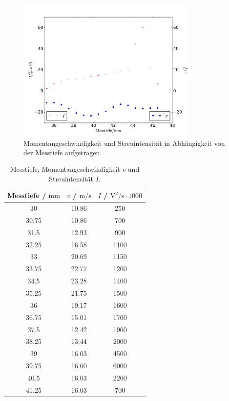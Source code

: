 \documentclass[
  bibliography=totoc,     %
  captions=tableheading,  %
  titlepage=firstiscover, %
]{scrartcl}
\begin{document}
      \begin{figure}
        \centering
        \includegraphics[width=0.8\textwidth]{b70.pdf}
        \caption{Momentangeschwindigkeit und Streuintensität in Abhängigkeit
        von der Messtiefe aufgetragen.}
        \label{fig:5}
      \end{figure}
      \begin{table}
        \centering
        \begin{tabular}{c c c}
          \toprule
          {Messtiefe / $\si{\milli\meter}$} & {$v$ / $\si{\meter\per\second}$} &
          {$I$ / $\si{\volt\squared\per\second} \cdot 1000$} \\
          \midrule
          30 & 10.86 & 250 \\
          30.75 & 10.86 & 700 \\
          31.5 & 12.93 & 900 \\
          32.25 & 16.58 & 1100 \\
          33 & 20.69 & 1150 \\
          33.75 & 22.77 & 1200 \\
          34.5 & 23.28 & 1400 \\
          35.25 & 21.75 & 1500 \\
          36 & 19.17 & 1600 \\
          36.75 & 15.01 & 1700 \\
          37.5 & 12.42 & 1900 \\
          38.25 & 13.44 & 2000 \\
          39 & 16.03 & 4500 \\
          39.75 & 16.60 & 6000 \\
          40.5 & 16.03 & 2200 \\
          41.25 & 16.03 & 700 \\
          \bottomrule
        \end{tabular}
        \caption{Messtiefe, Momentangeschwindigkeit $v$ und Streuintensität $I$.}
        \label{tab:6}
      \end{table}
\end{document}
